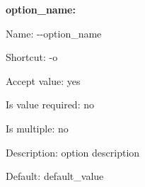 {\bfseries option\+\_\+name\+:}


\begin{DoxyItemize}
\item Name\+: {\ttfamily -\/-\/option\+\_\+name}
\item Shortcut\+: {\ttfamily -\/o}
\item Accept value\+: yes
\item Is value required\+: no
\item Is multiple\+: no
\item Description\+: option description
\item Default\+: {\ttfamily \textquotesingle{}default\+\_\+value\textquotesingle{}} 
\end{DoxyItemize}